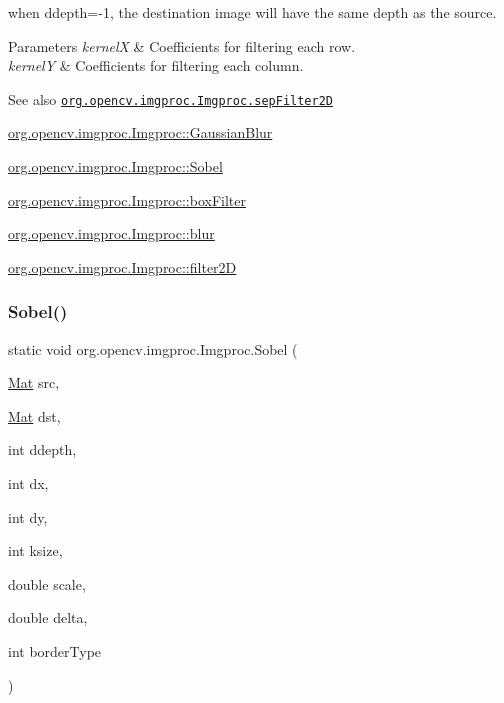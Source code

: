 when {\ttfamily ddepth=-\/1}, the destination image will have the same depth as the source.


\begin{DoxyParams}{Parameters}
{\em kernelX} & Coefficients for filtering each row. \\
\hline
{\em kernelY} & Coefficients for filtering each column.\\
\hline
\end{DoxyParams}
\begin{DoxySeeAlso}{See also}
\href{http://docs.opencv.org/modules/imgproc/doc/filtering.html#sepfilter2d}{\tt org.\+opencv.\+imgproc.\+Imgproc.\+sep\+Filter2D} 

\mbox{\hyperlink{classorg_1_1opencv_1_1imgproc_1_1_imgproc_a1f720ad6bef4616a3268c98abd811350}{org.\+opencv.\+imgproc.\+Imgproc\+::\+Gaussian\+Blur}} 

\mbox{\hyperlink{classorg_1_1opencv_1_1imgproc_1_1_imgproc_a85a8cac062c05efeecf99de50f3ab8d7}{org.\+opencv.\+imgproc.\+Imgproc\+::\+Sobel}} 

\mbox{\hyperlink{classorg_1_1opencv_1_1imgproc_1_1_imgproc_afb9afdc474cdb1b9242cf16ffc7017e3}{org.\+opencv.\+imgproc.\+Imgproc\+::box\+Filter}} 

\mbox{\hyperlink{classorg_1_1opencv_1_1imgproc_1_1_imgproc_ad7911d369fbc543ce20fb9872498e9c7}{org.\+opencv.\+imgproc.\+Imgproc\+::blur}} 

\mbox{\hyperlink{classorg_1_1opencv_1_1imgproc_1_1_imgproc_af8d713c4327b7458705f063ad4fa83e5}{org.\+opencv.\+imgproc.\+Imgproc\+::filter2D}} 
\end{DoxySeeAlso}
\mbox{\label{classorg_1_1opencv_1_1imgproc_1_1_imgproc_a85a8cac062c05efeecf99de50f3ab8d7}} 
\subsubsection{\texorpdfstring{Sobel()}{Sobel()}\hspace{0.1cm}{\footnotesize\ttfamily [1/3]}}
{\footnotesize\ttfamily static void org.\+opencv.\+imgproc.\+Imgproc.\+Sobel (\begin{DoxyParamCaption}\item[{\mbox{\hyperlink{classorg_1_1opencv_1_1core_1_1_mat}{Mat}}}]{src,  }\item[{\mbox{\hyperlink{classorg_1_1opencv_1_1core_1_1_mat}{Mat}}}]{dst,  }\item[{int}]{ddepth,  }\item[{int}]{dx,  }\item[{int}]{dy,  }\item[{int}]{ksize,  }\item[{double}]{scale,  }\item[{double}]{delta,  }\item[{int}]{border\+Type }\end{DoxyParamCaption})\hspace{0.3cm}{\ttfamily [static]}}

